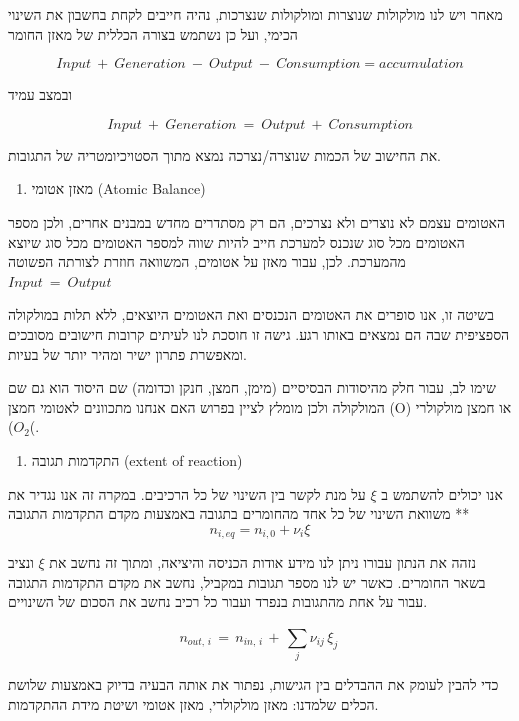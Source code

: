 \documentclass[
  hebrew,
  letterpaper,
  DIV=11,
  numbers=noendperiod]{scrreprt}
\providecommand{\tightlist}{%
  \setlength{\itemsep}{0pt}\setlength{\parskip}{0pt}}
\begin{document}
מאחר ויש לנו מולקולות שנוצרות ומולקולות שנצרכות, נהיה חייבים לקחת בחשבון
את השינוי הכימי, ועל כן נשתמש בצורה הכללית של מאזן החומר

\[Input\  + \ Generation\  - \ Output\  - \ Consumption = accumulation\]

ובמצב עמיד

\[Input\  + \ Generation\  = \ Output\  + \ Consumption\]

את החישוב של הכמות שנוצרה/נצרכה נמצא מתוך הסטויכיומטריה של התגובות.

\begin{enumerate}
\def\labelenumi{\arabic{enumi}.}
\setcounter{enumi}{1}
\tightlist
\item
  מאזן אטומי (Atomic Balance)
\end{enumerate}

האטומים עצמם לא נוצרים ולא נצרכים, הם רק מסתדרים מחדש במבנים אחרים, ולכן
מספר האטומים מכל סוג שנכנס למערכת חייב להיות שווה למספר האטומים מכל סוג
שיוצא מהמערכת. לכן, עבור מאזן על אטומים, המשוואה חוזרת לצורתה הפשוטה
\(Input\  = \ Output\)

בשיטה זו, אנו סופרים את האטומים הנכנסים ואת האטומים היוצאים, ללא תלות
במולקולה הספציפית שבה הם נמצאים באותו רגע. גישה זו חוסכת לנו לעיתים
קרובות חישובים מסובכים ומאפשרת פתרון ישיר ומהיר יותר של בעיות.

שימו לב, עבור חלק מהיסודות הבסיסיים (מימן, חמצן, חנקן וכדומה) שם היסוד
הוא גם שם המולקולה ולכן מומלץ לציין בפרוש האם אנחנו מתכוונים לאטומי חמצן
(O) או חמצן מולקולרי (\(O_{2}\)(.

\begin{enumerate}
\def\labelenumi{\arabic{enumi}.}
\setcounter{enumi}{2}
\tightlist
\item
  התקדמות תגובה (extent of reaction)
\end{enumerate}

אנו יכולים להשתמש ב \(\xi\) על מנת לקשר בין השינוי של כל הרכיבים. במקרה
זה אנו נגדיר את משוואת השינוי של כל אחד מהחומרים בתגובה באמצעות מקדם
התקדמות התגובה ** \[n_{i,eq} = n_{i,0} + \nu_{i}\xi\]

נזהה את הנתון עבורו ניתן לנו מידע אודות הכניסה והיציאה, ומתוך זה נחשב את
\(\xi\) ונציב בשאר החומרים. כאשר יש לנו מספר תגובות במקביל, נחשב את מקדם
התקדמות התגובה עבור על אחת מהתגובות בנפרד ועבור כל רכיב נחשב את הסכום של
השינויים.

\[n_{out,\, i}\, = \, n_{in,\, i}\, + \,\sum_{j}^{}{\nu_{ij}\,\xi_{j}}\,\]

כדי להבין לעומק את ההבדלים בין הגישות, נפתור את אותה הבעיה בדיוק באמצעות
שלושת הכלים שלמדנו: מאזן מולקולרי, מאזן אטומי ושיטת מידת ההתקדמות.
\end{document}
